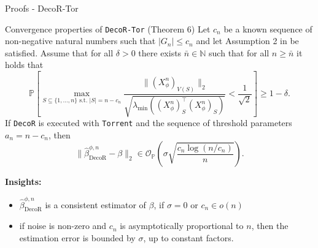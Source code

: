 
\begin{frame}[shrink=15]{\normalsize Proofs - DecoR-Tor}
    \begin{block}{Convergence properties of \texttt{DecoR-Tor} (Theorem 6)}
        Let $c_n$ be a known sequence of non-negative natural numbers such that $|G_n| \leq c_n$ and let Assumption 2 in \cite{bhatia2015robustregressionhardthresholding} be satisfied. Assume that for all $\delta > 0$ there exists $\bar{n} \in \mathbb{N}$ such that for all $n \geq \bar{n}$ it holds that
        \begin{equation*}
            \mathbb{P}\left[ \max_{S \subseteq \{1,\dots,n\} \text{ s.t. } |S|=n-c_n} \frac{\|(X_{\phi}^n)_{V(S)}\|_2}{\sqrt{\lambda_{\min}\left((X_{\phi}^n)_S^\top (X_{\phi}^n)_S\right)}} < \frac{1}{\sqrt{2}} \right] \geq 1 - \delta.
        \end{equation*}
        If \texttt{DecoR} is executed with \texttt{Torrent} and the sequence of threshold parameters $a_n = n - c_n$, then
        \begin{equation*}
            \|\hat{\beta}_{\text{DecoR}}^{\phi,n} - \beta\|_2 \in \mathcal{O}_{\mathbb{P}}\left( \sigma \sqrt{\frac{c_n \log(n/c_n)}{n}} \right).
        \end{equation*}
    \end{block}
    \textbf{Insights:}
    \begin{itemize}
        \item $\hat{\beta}_{\text{DecoR}}^{\phi,n}$ is a consistent estimator of $\beta$, if $\sigma=0$ or $c_n \in o(n)$
        \item if noise is non-zero and $c_n$ is asymptotically proportional to $n$, then the estimation error is bounded by $\sigma$, up to constant factors.
    \end{itemize}
\end{frame}